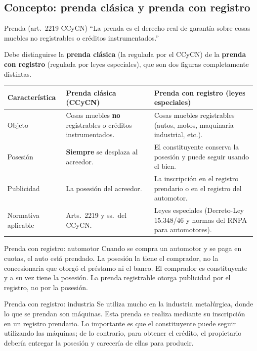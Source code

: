 \documentclass[12pt,oneside]{book}
\begin{document}
\subsection{Concepto: prenda clásica y prenda con registro}

\begin{definicion}{Prenda (art.~2219 CCyCN)}
``La prenda es el derecho real de garantía sobre cosas muebles no registrables o créditos instrumentados.''
\end{definicion}

Debe distinguirse la \textbf{prenda clásica} (la regulada por el CCyCN) de la \textbf{prenda con registro} (regulada por leyes especiales), que son dos figuras completamente distintas.

\begin{table}[H]
\centering
\begin{tabularx}{\textwidth}{@{}>{\raggedright\arraybackslash}p{}>{\raggedright\arraybackslash}X>{\raggedright\arraybackslash}X@{}}
\toprule
\textbf{Característica} & \textbf{Prenda clásica (CCyCN)} & \textbf{Prenda con registro (leyes especiales)} \\
\midrule
Objeto & Cosas muebles \textbf{no} registrables o créditos instrumentados. & Cosas muebles registrables (autos, motos, maquinaria industrial, etc.). \\
Posesión & \textbf{Siempre} se desplaza al acreedor. & El constituyente conserva la posesión y puede seguir usando el bien. \\
Publicidad & La posesión del acreedor. & La inscripción en el registro prendario o en el registro del automotor. \\
Normativa aplicable & Arts.~2219 y ss.\ del CCyCN. & Leyes especiales (Decreto-Ley 15.348/46 y normas del RNPA para automotores). \\
\bottomrule
\end{tabularx}
\end{table}

\begin{ejemplo}{Prenda con registro: automotor}
Cuando se compra un automotor y se paga en cuotas, el auto está prendado. La posesión la tiene el comprador, no la concesionaria que otorgó el préstamo ni el banco. El comprador es constituyente y a su vez tiene la posesión. La prenda registrable otorga publicidad por el registro, no por la posesión.
\end{ejemplo}

\begin{ejemplo}{Prenda con registro: industria}
Se utiliza mucho en la industria metalúrgica, donde lo que se prendan son máquinas. Esta prenda se realiza mediante su inscripción en un registro prendario. Lo importante es que el constituyente puede seguir utilizando las máquinas; de lo contrario, para obtener el crédito, el propietario debería entregar la posesión y carecería de ellas para producir.
\end{ejemplo}
\end{document}
